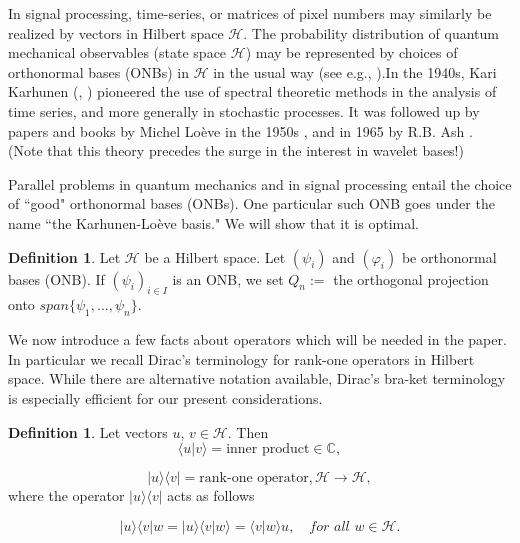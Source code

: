 \documentclass{amsart}
\theoremstyle{definition}
\newtheorem{definition}[theorem]{Definition}
\theoremstyle{remark}
\numberwithin{equation}{section}
\begin{document}
In signal processing, time-series, or matrices of pixel 
numbers may similarly be realized by vectors in Hilbert space 
$\mathcal{H}$. The probability distribution of quantum mechanical 
observables (state space $\mathcal{H}$) may be represented by choices of 
orthonormal bases (ONBs) in $\mathcal{H}$ in the usual way (see e.g., 
\cite{Jor06}).In the 1940s, Kari Karhunen (\cite{Kar46}, \cite{Kar52}) 
pioneered the use of spectral theoretic methods in the analysis of time 
series, and more generally in stochastic processes. It was followed up by 
papers and books by Michel Lo{\`e}ve in the 1950s \cite{Loe52}, and in 1965 
by R.B. Ash \cite{Ash90}. (Note that this theory precedes the surge in the 
interest in wavelet bases!)

Parallel problems in quantum mechanics and in signal processing 
entail the choice of ``good" orthonormal bases (ONBs). One particular such ONB 
goes under the name ``the Karhunen-Lo\`{e}ve basis." We will show that it is 
optimal.

\begin{definition}
\label{D:6.1}
Let $\mathcal{H}$ be a Hilbert space.
Let $(\psi_{i})$ and $(\varphi_{i})$ be orthonormal bases (ONB).
If $(\psi_{i})_{i \in I}$ is an ONB, we set $Q_{n}:=$ the orthogonal projection 
onto $span\{\psi_{1}, ... , \psi_{n}\}$.
\end{definition}

We now introduce a few facts about operators which will be needed in the paper. In particular we recall Dirac's terminology \cite{Dir47} for rank-one operators in Hilbert space. While there are alternative notation available, Dirac's bra-ket terminology is especially efficient for our present considerations.
\begin{definition}
\label{D:6.2}
Let vectors $u$, $v \in \mathcal{H}$.  Then  
\begin{equation}
\label{E:dirac1}
  \langle u | v \rangle = \text{inner product} \in \mathbb{C},
\end{equation}

\begin{equation}
\label{E:dirac2}
  |u \rangle \langle v| = \text{rank-one operator}, 
  \mathcal{H} \to \mathcal{H},
\end{equation}
 where the operator $|u \rangle \langle v|$ acts as follows

\begin{equation}
\label{E:dirac3}
|u \rangle \langle v|w = |u\rangle \langle v|w \rangle 
  = \langle v | w \rangle u, \quad \textit{for all } w \in \mathcal{H}.
\end{equation}
\end{definition}
\end{document}
